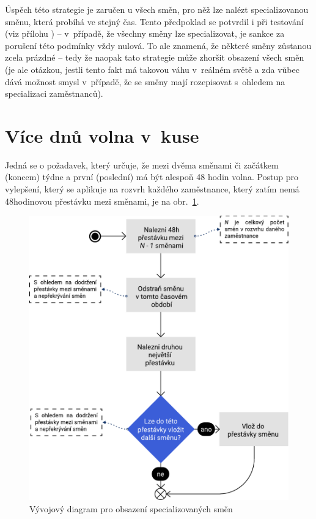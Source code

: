 \documentclass[twoside]{ctuthesis}
\begin{document}
Úspěch této strategie je zaručen u všech směn, pro něž lze nalézt specializovanou směnu, která probíhá ve stejný čas. Tento předpoklad se potvrdil i při testování (viz přílohu ) – v~případě, že všechny směny lze specializovat, je sankce za porušení této podmínky vždy nulová. To ale znamená, že některé směny zůstanou zcela prázdné – tedy že naopak tato strategie může zhoršit obsazení všech směn  (je ale otázkou, jestli tento fakt má takovou váhu v~reálném světě a zda vůbec dává možnost  smysl v~případě, že se směny mají rozepisovat s~ohledem na specializaci zaměstnanců).

\section{Více dnů volna v~kuse}
Jedná se o požadavek, který určuje, že mezi dvěma směnami či začátkem (koncem) týdne a první (poslední) má být alespoň 48 hodin volna. Postup pro vylepšení, který se aplikuje na rozvrh každého zaměstnance, který zatím nemá 48hodinovou přestávku mezi směnami, je na obr.~\ref{fig:freedays}.

\begin{figure}
	\includegraphics[scale=0.7]{img/free-days.pdf}
	\caption{Vývojový diagram pro obsazení specializovaných směn}
	\label{fig:freedays}
\end{figure}
\end{document}
